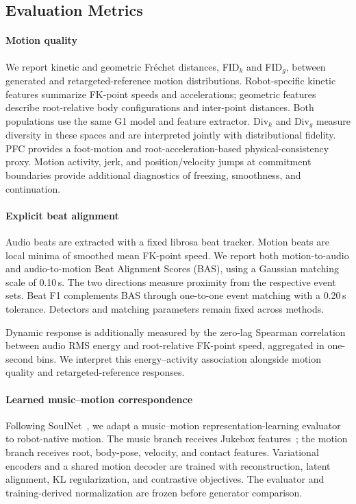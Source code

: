 
\subsection{Evaluation Metrics}
\label{sec:evaluation_metrics}

\paragraph{Motion quality}
We report kinetic and geometric Fr\'echet distances,
FID$_k$ and FID$_g$, between generated and retargeted-reference
motion distributions.
Robot-specific kinetic features summarize FK-point speeds
and accelerations; geometric features describe root-relative
body configurations and inter-point distances.
Both populations use the same G1 model and feature extractor.
Div$_k$ and Div$_g$ measure diversity in these spaces and
are interpreted jointly with distributional fidelity.
PFC provides a foot-motion and root-acceleration-based
physical-consistency proxy.
Motion activity, jerk, and position/velocity jumps at
commitment boundaries provide additional diagnostics
of freezing, smoothness, and continuation.

\paragraph{Explicit beat alignment}
Audio beats are extracted with a fixed librosa beat tracker.
Motion beats are local minima of smoothed mean FK-point
speed.
We report both motion-to-audio and audio-to-motion
Beat Alignment Scores (BAS), using a Gaussian matching
scale of 0.10\,s.
The two directions measure proximity from the respective
event sets.
Beat F1 complements BAS through one-to-one event matching
with a 0.20\,s tolerance.
Detectors and matching parameters remain fixed across methods.

Dynamic response is additionally measured by the zero-lag
Spearman correlation between audio RMS energy and
root-relative FK-point speed, aggregated in one-second bins.
We interpret this energy--activity association alongside
motion quality and retargeted-reference responses.

\paragraph{Learned music--motion correspondence}
Following SoulNet~\cite{li2025soulnet}, we adapt a
music--motion representation-learning evaluator to
robot-native motion.
The music branch receives Jukebox
features~\cite{dhariwal2020jukebox}; the motion branch
receives root, body-pose, velocity, and contact features.
Variational encoders and a shared motion decoder are
trained with reconstruction, latent alignment,
KL regularization, and contrastive objectives.
The evaluator and training-derived normalization are
frozen before generator comparison.

